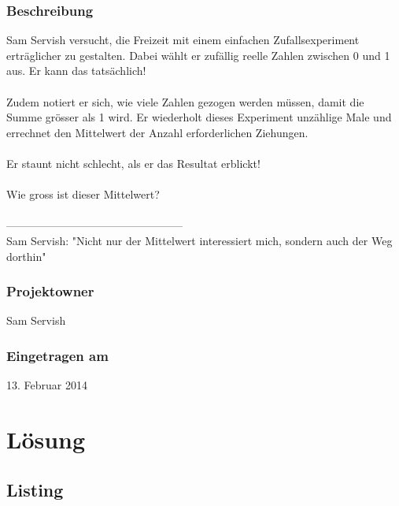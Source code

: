 \documentclass[a4paper, 10pt, fleqn]{article}
\begin{document}
\subsubsection*{Beschreibung}
Sam Servish versucht, die Freizeit mit einem einfachen Zufallsexperiment 
erträglicher zu gestalten. Dabei wählt er zufällig reelle Zahlen zwischen 0 
und 1 aus. Er kann das tatsächlich!
\\\\
Zudem notiert er sich, wie viele Zahlen gezogen werden müssen, damit die Summe 
grösser als 1 wird. Er wiederholt dieses Experiment unzählige Male und 
errechnet den Mittelwert der Anzahl erforderlichen Ziehungen.
\\\\
Er staunt nicht schlecht, als er das Resultat erblickt!
\\\\
Wie gross ist dieser Mittelwert?
\\\\
------------------------------------------------\\
Sam Servish: "Nicht nur der Mittelwert interessiert mich, sondern auch der Weg 
dorthin"

\subsubsection*{Projektowner}
Sam Servish 

\subsubsection*{Eingetragen am}
13. Februar 2014 \\

\newpage

\section{Lösung}

\clearpage

\begin{appendices}

  \section{Listing}
%   

\end{appendices}
\end{document}
